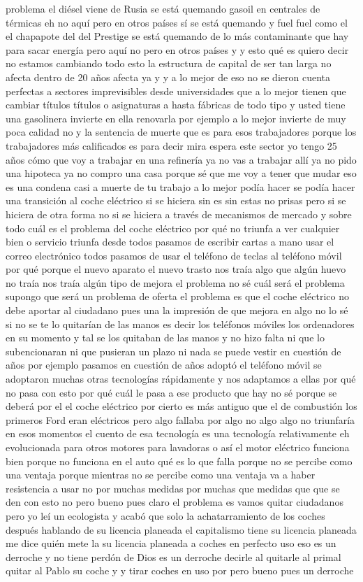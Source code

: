 problema el diésel viene de Rusia se está quemando gasoil en centrales de térmicas eh no aquí pero en otros países sí se está quemando y fuel fuel como el el chapapote del del Prestige se está quemando de lo más contaminante que hay para sacar energía pero aquí no pero en otros países y y esto qué es quiero decir no estamos cambiando todo esto la estructura de capital de ser tan larga no afecta dentro de 20 años afecta ya y y a lo mejor de eso no se dieron cuenta perfectas a sectores imprevisibles desde universidades que a lo mejor tienen que cambiar títulos títulos o asignaturas a hasta fábricas de todo tipo y usted tiene una gasolinera invierte en ella renovarla por ejemplo a lo mejor invierte de muy poca calidad no y la sentencia de muerte que es para esos trabajadores porque los trabajadores más calificados es para decir mira espera este sector yo tengo 25 años cómo que voy a trabajar en una refinería ya no vas a trabajar allí ya no pido una hipoteca ya no compro una casa porque sé que me voy a tener que mudar eso es una condena casi a muerte de tu trabajo a lo mejor podía hacer se podía hacer una transición al coche eléctrico si se hiciera sin es sin estas no prisas pero si se hiciera de otra forma no si se hiciera a través de mecanismos de mercado y sobre todo cuál es el problema del coche eléctrico por qué no triunfa a ver cualquier bien o servicio triunfa desde todos pasamos de escribir cartas a mano usar el correo electrónico todos pasamos de usar el teléfono de teclas al teléfono móvil por qué porque el nuevo aparato el nuevo trasto nos traía algo que algún huevo no traía nos traía algún tipo de mejora el problema no sé cuál será el problema supongo que será un problema de oferta el problema es que el coche eléctrico no debe aportar al ciudadano pues una la impresión de que mejora en algo no lo sé si no se te lo quitarían de las manos es decir los teléfonos móviles los ordenadores en su momento y tal se los quitaban de las manos y no hizo falta ni que lo subencionaran ni que pusieran un plazo ni nada se puede vestir en cuestión de años por ejemplo pasamos en cuestión de años adoptó el teléfono móvil se adoptaron muchas otras tecnologías rápidamente y nos adaptamos a ellas por qué no pasa con esto por qué cuál le pasa a ese producto que hay no sé porque se deberá por el el coche eléctrico por cierto es más antiguo que el de combustión los primeros Ford eran eléctricos pero algo fallaba por algo no algo algo no triunfaría en esos momentos el cuento de esa tecnología es una tecnología relativamente eh evolucionada para otros motores para lavadoras o así el motor eléctrico funciona bien porque no funciona en el auto qué es lo que falla porque no se percibe como una ventaja porque mientras no se percibe como una ventaja va a haber resistencia a usar no por muchas medidas por muchas que medidas que que se den con esto no pero bueno pues claro el problema es vamos quitar ciudadanos pero yo leí un ecologista y acabó que solo la achatarramiento de los coches después hablando de su licencia planeada el capitalismo tiene su licencia planeada me dice quién mete la su licencia planeada a coches en perfecto uso eso es un derroche y no tiene perdón de Dios es un derroche decirle al quitarle al primal quitar al Pablo su coche y y tirar coches en uso por pero bueno pues un derroche 